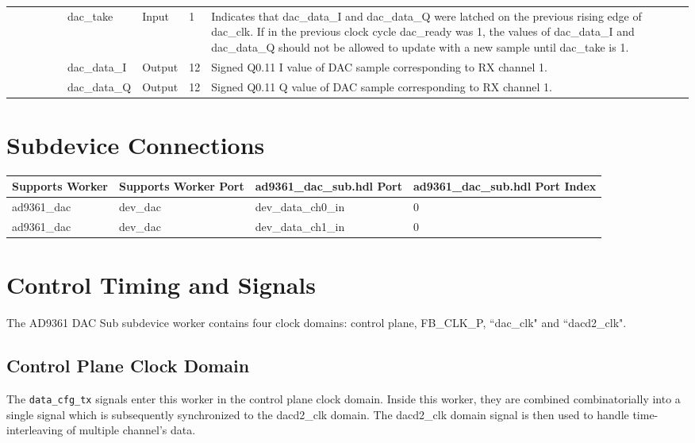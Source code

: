 \documentclass{article}
\def\comp{ad9361\_dac\_sub}
\def\Comp{AD9361 DAC Sub}
\begin{document}
\begin{landscape}
\begin{scriptsize}
\begin{longtable}{|p{1.75cm}|p{2.25cm}|p{1.25cm}|p{1.25cm}|p{1.25cm}|p{3cm}|p{1.4cm}|p{0.9cm}|p{6.88cm}|}
			\cline{6-9}
			&             &        &     &      & dac\_take    & Input     & 1      & Indicates that dac\_data\_I and dac\_data\_Q were latched on the previous rising edge of dac\_clk. If in the previous clock cycle dac\_ready was 1, the values of dac\_data\_I and dac\_data\_Q should not be allowed to update with a new sample until dac\_take is 1. \\
			\cline{6-9}
			&             &        &     &      & dac\_data\_I & Output    & 12     & Signed Q0.11 I value of DAC sample corresponding to RX channel 1. \\
			\cline{6-9}
			&             &        &     &      & dac\_data\_Q & Output    & 12     & Signed Q0.11 Q value of DAC sample corresponding to RX channel 1. \\
			\hline
		\end{longtable}
	\end{scriptsize}
	
	\section*{Subdevice Connections}
	\begin{scriptsize}
		\begin{tabular}{|p{5cm}|p{5cm}|p{5cm}|p{7.22cm}|}
			\hline
			\rowcolor{blue}
			Supports Worker & Supports Worker Port & \comp{}.hdl Port     & \comp{}.hdl Port Index \\
			\hline
			ad9361\_dac     & dev\_dac             & dev\_data\_ch0\_in & 0 \\
			\hline
			ad9361\_dac     & dev\_dac             & dev\_data\_ch1\_in & 0 \\
			\hline
		\end{tabular}
	\end{scriptsize}

\end{landscape}

\section*{Control Timing and Signals}
The \Comp{} subdevice worker contains four clock domains: control plane, FB\_CLK\_P, ``dac\_clk" and ``dacd2\_clk".
\subsection*{Control Plane Clock Domain}
The \verb+data_cfg_tx+ signals enter this worker in the control plane clock domain. Inside this worker, they are combined combinatorially into a single signal which is subsequently synchronized to the dacd2\_clk domain. The dacd2\_clk domain signal is then used to handle time-interleaving of multiple channel's data.
\end{document}
